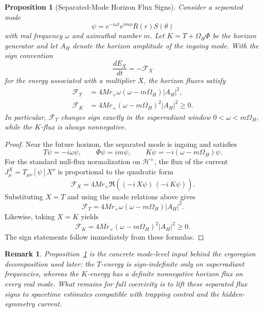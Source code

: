 \documentclass[12pt,a4paper]{article}
\newtheorem{proposition}[theorem]{Proposition}
\newtheorem{remark}[theorem]{Remark}
\begin{document}
\begin{proposition}[Separated-Mode Horizon Flux Signs]\label{thm:superradiant-modes}
Consider a separated mode
\begin{equation}
\psi = e^{-i\omega t} e^{im\phi} R(r) S(\theta)
\end{equation}
with real frequency $\omega$ and azimuthal number $m$. Let $K = T + \Omega_H \Phi$ be the horizon generator and let $A_H$ denote the horizon amplitude of the ingoing mode. With the sign convention
\begin{equation}
\frac{dE_X}{dt} = -\mathcal{F}_X
\end{equation}
for the energy associated with a multiplier $X$, the horizon fluxes satisfy
\begin{align}
\mathcal{F}_T &= 4 M r_+ \omega (\omega - m \Omega_H) |A_H|^2, \label{eq:horizon-flux-T}\\
\mathcal{F}_K &= 4 M r_+ (\omega - m \Omega_H)^2 |A_H|^2 \ge 0. \label{eq:horizon-flux-K}
\end{align}
In particular, $\mathcal{F}_T$ changes sign exactly in the superradiant window $0 < \omega < m\Omega_H$, while the $K$-flux is always nonnegative.
\end{proposition}

\begin{proof}
Near the future horizon, the separated mode is ingoing and satisfies
\begin{equation}
T\psi = -i\omega \psi, \qquad \Phi\psi = i m \psi, \qquad K\psi = -i(\omega - m\Omega_H)\psi.
\end{equation}
For the standard null-flux normalization on $\mathcal{H}^+$, the flux of the current $J^X_\mu = T_{\mu\nu}[\psi]X^\nu$ is proportional to the quadratic form
\begin{equation}
\mathcal{F}_X = 4 M r_+ \Re\!\left(( -i\,X\psi)\,\overline{(-i\,K\psi)}\right).
\end{equation}
Substituting $X=T$ and using the mode relations above gives
\begin{equation}
\mathcal{F}_T = 4 M r_+ \omega (\omega - m\Omega_H)|A_H|^2.
\end{equation}
Likewise, taking $X=K$ yields
\begin{equation}
\mathcal{F}_K = 4 M r_+ (\omega - m\Omega_H)^2 |A_H|^2 \ge 0.
\end{equation}
The sign statements follow immediately from these formulas.
\end{proof}

\begin{remark}
Proposition~\ref{thm:superradiant-modes} is the concrete mode-level input behind the ergoregion decomposition used later: the $T$-energy is sign-indefinite only on superradiant frequencies, whereas the $K$-energy has a definite nonnegative horizon flux on every real mode. What remains for full coercivity is to lift these separated flux signs to spacetime estimates compatible with trapping control and the hidden-symmetry current.
\end{remark}
\end{document}
